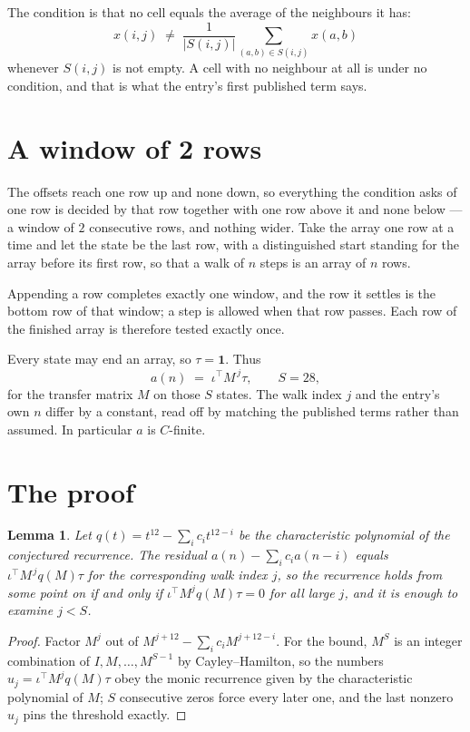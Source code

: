\documentclass[11pt,a4paper]{article}
\theoremstyle{plain}
\newtheorem{lemma}[theorem]{Lemma}
\theoremstyle{definition}
\begin{document}
The condition is that no cell equals the average of the neighbours it has:
\[
x(i,j)\;\neq\;\frac{1}{|S(i,j)|}\sum_{(a,b)\in S(i,j)}x(a,b)
\]
whenever $S(i,j)$ is not empty. A cell with no neighbour at all is under no condition, and that is what the entry's first published term says.

\section{A window of 2 rows}

The offsets reach one row up and none down, so everything the condition asks of one row is
decided by that row together with one row above it and none below --- a window of
$2$ consecutive rows, and nothing wider. Take the array one row at a time
and let the state be the last row, with a distinguished start standing for the
array before its first row, so that a walk of $n$ steps is an array of $n$ rows.

Appending a row completes exactly one window, and the row it settles is the bottom row of that window; a step is
allowed when that row passes. Each row of the finished
array is therefore tested exactly once.

Every state may end an array, so $\tau=\mathbf{1}$.
Thus
\[
a(n)\;=\;\iota^{\!\top}M^{\,j}\tau ,\qquad S=28,
\]
for the transfer matrix $M$ on those $S$ states. The walk index $j$ and the entry's own $n$
differ by a constant, read off by matching the published terms rather than assumed. In
particular $a$ is $C$-finite.

\section{The proof}

\begin{lemma}\label{lem:crit}
Let $q(t)=t^{12}-\sum_i c_it^{12-i}$ be the characteristic polynomial of the
conjectured recurrence. The residual $a(n)-\sum_ic_ia(n-i)$ equals
$\iota^{\!\top}M^{\,j}q(M)\tau$ for the corresponding walk index $j$, so the recurrence
holds from some point on if and only if $\iota^{\!\top}M^{j}q(M)\tau=0$ for all large $j$,
and it is enough to examine $j<S$.
\end{lemma}

\begin{proof}
Factor $M^{j}$ out of $M^{j+12}-\sum_ic_iM^{j+12-i}$. For the bound, $M^{S}$
is an integer combination of $I,M,\dots,M^{S-1}$ by Cayley--Hamilton, so the numbers
$u_j=\iota^{\!\top}M^{j}q(M)\tau$ obey the monic recurrence given by the characteristic
polynomial of $M$; $S$ consecutive zeros force every later one, and the last nonzero $u_j$
pins the threshold exactly.
\end{proof}
\end{document}
